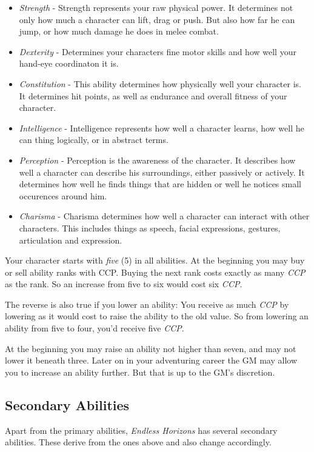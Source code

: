 \begin{itemize}
\item \emph{Strength} - Strength represents your raw physical power. It
  determines not only how much a character can lift, drag or push. But also how
  far he can jump, or how much damage he does in melee combat.
\item \emph{Dexterity} - Determines your characters fine motor skills and how
  well your hand-eye coordinaton it is.
\item \emph{Constitution} - This ability determines how physically well your
  character is. It determines hit points, as well as endurance and overall
  fitness of your character.
\item \emph{Intelligence} - Intelligence represents how well a character learns,
  how well he can thing logically, or in abstract terms.
\item \emph{Perception} - Perception is the awareness of the character. It
  describes how well a character can describe his surroundings, either passively
  or actively. It determines how well he finds things that are hidden or
  well he notices small occurences around him.
\item \emph{Charisma} - Charisma determines how well a character can interact
  with other characters. This includes things as speech, facial expressions,
  gestures, articulation and expression.
\end{itemize}

Your character starts with \emph{five} (5) in all abilities. At the beginning
you may buy or sell ability ranks with CCP. Buying the next rank costs exactly
as many \emph{CCP} as the rank. So an increase from five to six would cost six
\emph{CCP}.

The reverse is also true if you lower an ability: You receive as much \emph{CCP}
by lowering as it would cost to raise the ability to the old value. So from
lowering an ability from five to four, you'd receive five \emph{CCP}.

At the beginning you may raise an ability not higher than seven, and may not
lower it beneath three. Later on in your adventuring career the GM may allow you
to increase an ability further. But that is up to the GM's discretion.

\subsection{Secondary Abilities}

Apart from the primary abilities, \emph{Endless Horizons} has several secondary
abilities. These derive from the ones above and also change accordingly.

